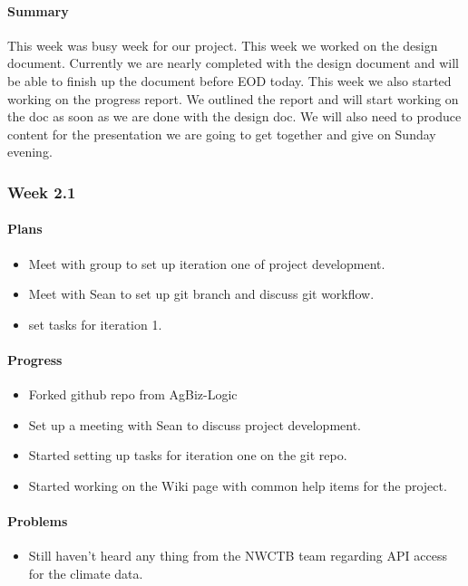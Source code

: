 \documentclass[onecolumn, draftclsnofoot,10pt, compsoc]{article}
\begin{document}
		      \paragraph{Summary} \hfill \break
		        This week was busy week for our project. This week we worked on the design document. Currently we are nearly completed with the design document and will be able to finish up the document before EOD today. This week we also started working on the progress report. We outlined the report and will start working on the doc as soon as we are done with the design doc. We will also need to produce content for the presentation we are going to get together and give on Sunday evening.\\
		        
		  \subsubsection{Week 2.1}
			\paragraph{Plans} \hfill \break
				\begin{itemize}
					\item Meet with group to set up iteration one of project development.
					\item Meet with Sean to set up git branch and discuss git workflow.
					\item set tasks for iteration 1.
				\end{itemize}

			\paragraph{Progress} \hfill \break
				\begin{itemize}
					\item Forked github repo from AgBiz-Logic
					\item Set up a meeting with Sean to discuss project development.
					\item Started setting up tasks for iteration one on the git repo.
					\item Started working on the Wiki page with common help items for the project.
				\end{itemize}
			\paragraph{Problems} \hfill \break
				\begin{itemize}
					\item Still haven't heard any thing from the NWCTB team regarding API access for the climate data.
				\end{itemize}
\end{document}
